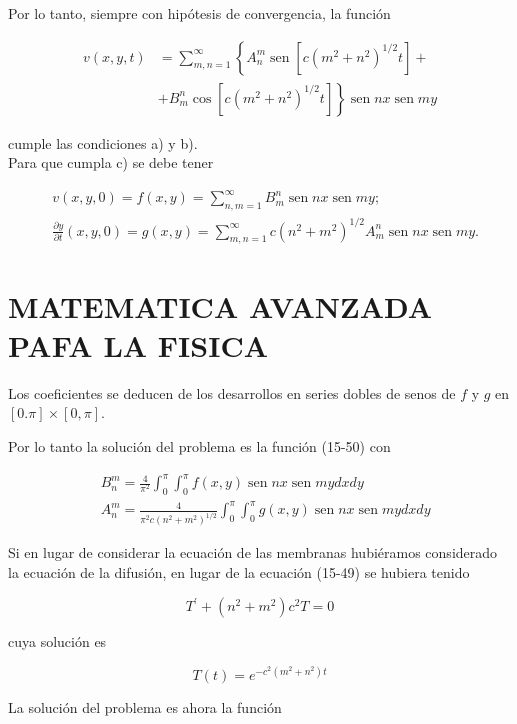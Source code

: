 \documentclass[10pt]{article}
\theoremstyle{plain}
\theoremstyle{definition}
\theoremstyle{remark}
\begin{document}
Por lo tanto, siempre con hipótesis de convergencia, la función


\begin{align*}
v(x, y, t) & =\sum_{m, n=1}^{\infty}\left\{A_{n}^{m} \operatorname{sen}\left[c\left(m^{2}+n^{2}\right)^{1 / 2} t\right]+\right. \\
& \left.+B_{m}^{n} \cos \left[c\left(m^{2}+n^{2}\right)^{1 / 2} t\right]\right\} \operatorname{sen} n x \operatorname{sen} m y \tag{15-50}
\end{align*}


cumple las condiciones a) y b).\\
Para que cumpla c) se debe tener

$$
\begin{aligned}
& v(x, y, 0)=f(x, y)=\sum_{n, m=1}^{\infty} B_{m}^{n} \operatorname{sen} n x \operatorname{sen} m y ; \\
& \frac{\partial y}{\partial t}(x, y, 0)=g(x, y)=\sum_{m, n=1}^{\infty} c\left(n^{2}+m^{2}\right)^{1 / 2} A_{m}^{n} \operatorname{sen} n x \operatorname{sen} m y .
\end{aligned}
$$

\section*{MATEMATICA AVANZADA PAFA LA FISICA}
Los coeficientes se deducen de los desarrollos en series dobles de senos de $f$ y $g$ en $[0 . \pi] \times[0, \pi]$.

Por lo tanto la solución del problema es la función (15-50) con

$$
\begin{aligned}
& B_{n}^{m}=\frac{4}{\pi^{2}} \int_{0}^{\pi} \int_{0}^{\pi} f(x, y) \operatorname{sen} n x \operatorname{sen} m y d x d y \\
& A_{n}^{m}=\frac{4}{\pi^{2} c\left(n^{2}+m^{2}\right)^{1 / 2}} \int_{0}^{\pi} \int_{0}^{\pi} g(x, y) \operatorname{sen} n x \operatorname{sen} m y d x d y
\end{aligned}
$$

Si en lugar de considerar la ecuación de las membranas hubiéramos considerado la ecuación de la difusión, en lugar de la ecuación (15-49) se hubiera tenido

$$
T^{\prime}+\left(n^{2}+m^{2}\right) c^{2} T=0
$$

cuya solución es

$$
T(t)=e^{-c^{2}\left(m^{2}+n^{2}\right) t}
$$

La solución del problema es ahora la función
\end{document}
